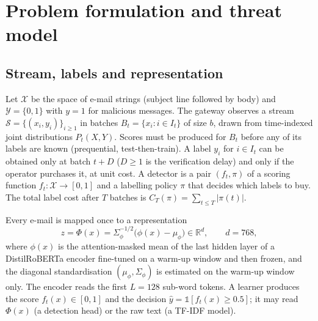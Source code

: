 \section{Problem formulation and threat model}\label{sec:formulation}

\subsection{Stream, labels and representation}
Let $\mathcal{X}$ be the space of e-mail strings (subject line followed by body) and $\mathcal{Y}=\{0,1\}$ with $y=1$ for malicious messages. The gateway observes a stream $\mathcal{S}=\{(x_i,y_i)\}_{i\ge 1}$ in batches $B_t=\{x_i : i\in I_t\}$ of size $b$, drawn from time-indexed joint distributions $P_t(X,Y)$. Scores must be produced for $B_t$ before any of its labels are known (prequential, test-then-train). A label $y_i$ for $i\in I_t$ can be obtained only at batch $t+D$ ($D\ge 1$ is the verification delay) and only if the operator purchases it, at unit cost. A detector is a pair $(f_t,\pi)$ of a scoring function $f_t:\mathcal{X}\to[0,1]$ and a labelling policy $\pi$ that decides which labels to buy. The total label cost after $T$ batches is $C_T(\pi)=\sum_{t\le T}|\pi(t)|$.

Every e-mail is mapped once to a representation
\begin{equation}
z=\Phi(x)=\Sigma_\phi^{-1/2}\big(\phi(x)-\mu_\phi\big)\in\mathbb{R}^{d},\qquad d=768,
\label{eq:phi}
\end{equation}
where $\phi(x)$ is the attention-masked mean of the last hidden layer of a DistilRoBERTa encoder fine-tuned on a warm-up window and then frozen, and the diagonal standardisation $(\mu_\phi,\Sigma_\phi)$ is estimated on the warm-up window only. The encoder reads the first $L=128$ sub-word tokens. A learner produces the score $f_t(x)\in[0,1]$ and the decision $\hat y=\mathbb{1}[f_t(x)\ge0.5]$; it may read $\Phi(x)$ (a detection head) or the raw text (a TF-IDF model).

